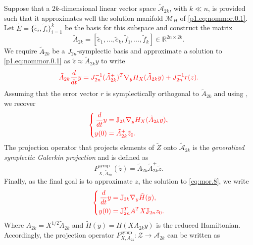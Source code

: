 Suppose that a $2k$-dimensional linear vector space $\tilde{ \mathcal A}_{2k}$, with $k\ll n$, is provided such that it approximates well the solution manifold $\mathcal M_H$ of \eqref{p1.eq:nommor.0.1}. Let $\tilde E = \{ \tilde e_i,\tilde f_i \}_{i=1}^k$ be the basis for this subspace and construct the matrix
\begin{equation} \label{p1.eq:nommor.0.7}
	\tilde A_{2k} = [\tilde e_1,\dots,\tilde e_k,\tilde f_1,\dots,\tilde f_k] \in \mathbb R^{2n\times 2k}.
\end{equation}
We require $\tilde A_{2k}$ be a $J_{2n}$-symplectic basis and approximate a solution to \eqref{p1.eq:nommor.0.1} as $\tilde z \approx \tilde A_{2k} y$ to write
\begin{equation} \label{p1.eq:nommor.0.8}
	\edit{ \tilde A_{2k} \frac d {dt} y = J^{-1}_{2n} (\tilde A_{2k}^+)^T \nabla_{y} H_X(\tilde A_{2k}y) + J^{-1}_{2n} r(z).}
\end{equation}
Assuming that the error vector $r$ is symplectically orthogonal to $\tilde A_{2k}$ and using , we recover
\begin{equation}
	{\color{red}  \left\{
	\begin{aligned}
		\frac d {dt} y &= \mathbb J_{2k} \nabla_{y} H_X(\tilde A_{2k} y), \\
		y(0) &= \tilde A_{2k}^+ \tilde z_0.
	\end{aligned}
	\right.	}
\end{equation}
The projection operator that projects elements of $\tilde Z$ onto $\tilde {\mathcal A}_{2k}$ is the \emph{generalized symplectic Galerkin projection} and is defined as
\begin{equation} \label{p1.eq:nommor.0.9}
	P_{X,\tilde A_{2k}}^{\text{symp}}(\tilde z) = \tilde A_{2k} \tilde A_{2k}^+ \tilde z.
\end{equation}
Finally, as the final goal is to approximate $z$, the solution to \eqref{eq:mor.8}, we write
\begin{equation} \label{p1.eq:nommor.0.10}
	\edit{ \left\{
	\begin{aligned}
		\frac{d}{dt} y &= \mathbb J_{2k} \nabla_y \tilde H(y), \\
		y(0) &= \mathbb J_{2n}^T A^T X \mathbb J_{2n} z_0.
	\end{aligned}
	\right.	}
\end{equation}
Where $A_{2k} = X^{1/2} \tilde A_{2k}$ and $\tilde H(y) = H(XA_{2k}y)$ is the reduced Hamiltonian. Accordingly, the projection operator $P_{X,A_{2k}}^\text{symp}:\mathcal Z\to \mathcal A_{2k}$ can be written as
